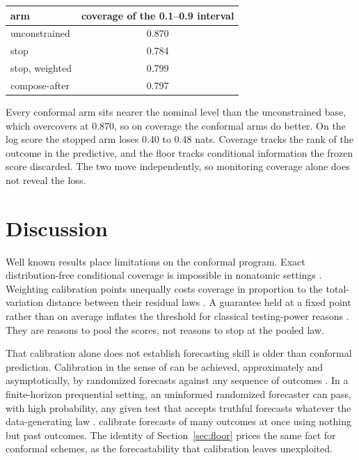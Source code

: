 \documentclass[11pt]{article}
\theoremstyle{remark}
\begin{document}
\begin{center}
\begin{tabular}{lc}
\toprule
arm & coverage of the 0.1--0.9 interval \\
\midrule
unconstrained    & 0.870 \\
stop             & 0.784 \\
stop, weighted   & 0.799 \\
compose-after    & 0.797 \\
\bottomrule
\end{tabular}
\end{center}

Every conformal arm sits nearer the nominal level than the unconstrained base,
which overcovers at 0.870, so on coverage the conformal arms do better. On the log
score the stopped arm loses 0.40 to 0.48 nats. Coverage tracks the rank of the
outcome in the predictive, and the floor tracks conditional information the frozen
score discarded. The two move independently, so monitoring coverage alone does not
reveal the loss.

\section{Discussion}\label{sec:discussion}

Well known results place limitations on the conformal program. Exact distribution-free
conditional coverage is impossible in nonatomic settings
\citep{lei2014distribution,barber2021limits}. Weighting calibration points unequally
costs coverage in proportion to the total-variation distance between their residual
laws \citep{barber2023beyond}. A guarantee held at a fixed point rather than on
average inflates the threshold for classical testing-power reasons
\citep{li1989honest,low1997nonparametric,cai2004adaptation}. They are reasons to pool
the scores, not reasons to stop at the pooled law.

That calibration alone does not establish forecasting skill is older than conformal
prediction. Calibration in the sense of \citet{dawid1982} can be achieved, approximately and
asymptotically, by randomized forecasts against any sequence of outcomes \citep{fostervohra1998}.
In a finite-horizon prequential setting, an uninformed randomized forecaster can pass, with high
probability, any given test that accepts truthful forecasts whatever the data-generating law
\citep{sandroni2003}. \citet{fishelson2026} calibrate forecasts of many outcomes at once using
nothing but past outcomes. The identity of Section~\ref{sec:floor} prices the same fact for
conformal schemes, as the forecastability that calibration leaves unexploited.
\end{document}
